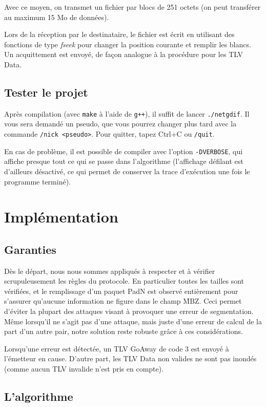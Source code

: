 \documentclass[11pt,a4paper]{article}
\begin{document}
Avec ce moyen, on transmet un fichier par blocs de 251 octets (on peut transférer au maximum 15 Mo de données). 

Lors de la réception par le destinataire, le fichier est écrit en utilisant des fonctions de type \emph{fseek} pour changer la position courante et remplir
les blancs. Un acquittement est envoyé, de façon analogue à la procédure pour les TLV Data.

\subsection{Tester le projet}

Après compilation (avec \texttt{make} à l'aide de \texttt{g++}), il suffit de lancer \texttt{./netgdif}. Il vous sera demandé un pseudo, que vous pourrez changer
plus tard avec la commande \texttt{/nick <pseudo>}.  Pour quitter, tapez Ctrl+C ou \texttt{/quit}.

En cas de problème, il est possible de compiler avec l'option \texttt{-DVERBOSE}, qui affiche presque tout ce qui se passe dans l'algorithme (l'affichage défilant 
est d'ailleurs désactivé, ce qui permet de conserver la trace d'exécution une fois le programme terminé).

\section{Implémentation}

\subsection{Garanties}

Dès le départ, nous nous sommes appliqués à respecter et à vérifier scrupuleusement les règles du protocole. En particulier toutes les tailles sont vérifiées, et le remplissage
d'un paquet PadN est observé entièrement pour s'assurer qu'aucune information ne figure dans le champ \f{MBZ}. Ceci permet d'éviter la plupart des attaques visant à provoquer 
une erreur de segmentation. Même lorsqu'il ne s'agit pas d'une attaque, mais juste d'une erreur de calcul de la part d'un autre pair, notre solution reste robuste grâce à
ces considérations.

Lorsqu'une erreur est détectée, un TLV GoAway de code 3 est envoyé à l'émetteur en cause. D'autre part, les TLV Data non valides ne sont pas inondés (comme aucun TLV invalide 
n'est pris en compte).

\subsection{L'algorithme}
	
\end{document}
